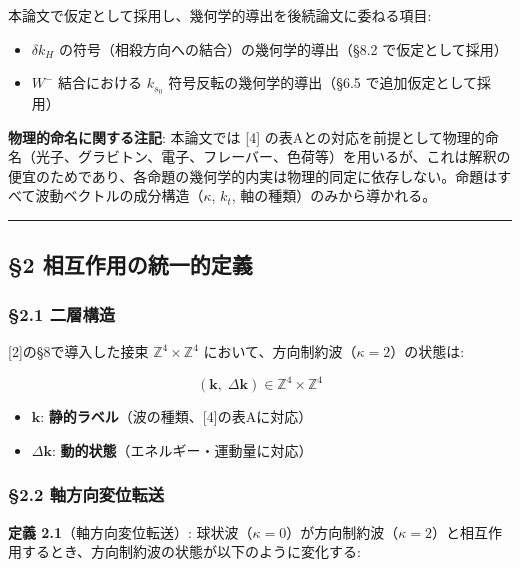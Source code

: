 \documentclass[
  a4paper,11pt]{ltjsarticle}
\providecommand{\tightlist}{%
  \setlength{\itemsep}{0pt}\setlength{\parskip}{0pt}}
\theoremstyle{definition}
\theoremstyle{remark}
\begin{document}
本論文で仮定として採用し、幾何学的導出を後続論文に委ねる項目:

\begin{itemize}
\tightlist
\item
  \(\delta k_H\) の符号（相殺方向への結合）の幾何学的導出（§8.2
  で仮定として採用）
\item
  \(W^-\) 結合における \(k_{s_0}\) 符号反転の幾何学的導出（§6.5
  で追加仮定として採用）
\end{itemize}

\textbf{物理的命名に関する注記}: 本論文では {[}4{]}
の表Aとの対応を前提として物理的命名（光子、グラビトン、電子、フレーバー、色荷等）を用いるが、これは解釈の便宜のためであり、各命題の幾何学的内実は物理的同定に依存しない。命題はすべて波動ベクトルの成分構造（\(\kappa\),
\(k_t\), 軸の種類）のみから導かれる。

\begin{center}\rule{0.5\linewidth}{0.5pt}\end{center}

\subsection{§2
相互作用の統一的定義}\label{ux76f8ux4e92ux4f5cux7528ux306eux7d71ux4e00ux7684ux5b9aux7fa9}

\subsubsection{§2.1 二層構造}\label{ux4e8cux5c64ux69cbux9020}

{[}2{]}の§8で導入した接束 \(\mathbb{Z}^4 \times \mathbb{Z}^4\)
において、方向制約波（\(\kappa = 2\)）の状態は:

\[(\mathbf{k},\; \Delta\mathbf{k}) \in \mathbb{Z}^4 \times \mathbb{Z}^4\]

\begin{itemize}
\tightlist
\item
  \(\mathbf{k}\): \textbf{静的ラベル}（波の種類、{[}4{]}の表Aに対応）
\item
  \(\Delta\mathbf{k}\): \textbf{動的状態}（エネルギー・運動量に対応）
\end{itemize}

\subsubsection{§2.2
軸方向変位転送}\label{ux8ef8ux65b9ux5411ux5909ux4f4dux8ee2ux9001}

\textbf{定義 2.1}（軸方向変位転送）:
球状波（\(\kappa = 0\)）が方向制約波（\(\kappa = 2\)）と相互作用するとき、方向制約波の状態が以下のように変化する:
\end{document}
